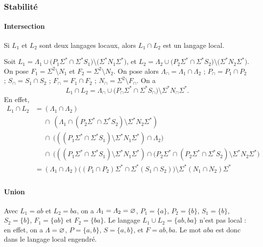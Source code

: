 \subsubsection{Stabilité}
\paragraph{Intersection}

\begin{prop}
	Si $L_1$\/ et $L_2$\/ sont deux langages locaux, alors $L_1 \cap L_2$\/ est un langage local.
\end{prop}

\begin{prv}
	Soit $L_1 = \Lambda_1 \cup \big(P_1 \Sigma^* \cap \Sigma^* S_1\big)\setminus\big(\Sigma^* N_1 \Sigma^*\big)$, et $L_2 = \Lambda_2 \cup \big(P_2 \Sigma^* \cap \Sigma^* S_2\big)\setminus\big(\Sigma^* N_2 \Sigma^*\big)$. On pose $F_1 = \Sigma^2 \setminus N_1$\/ et $F_2 = \Sigma^2 \setminus N_2$.
	On pose alors $\Lambda_\cap = \Lambda_1 \cap \Lambda_2$\/ ; $P_\cap = P_1 \cap P_2$\/ ; $S_\cap = S_1 \cap S_2$\/ ; $F_\cap = F_1 \cap F_2$\/ ; $N_\cap = \Sigma^2 \setminus F_\cap$. On a \[
		L_1 \cap L_2 = \Lambda_\cap \cup \big(P_\cap \Sigma^* \cap \Sigma^* S_\cap \big) \setminus \Sigma^* N_\cap \Sigma^*
	.\]
	En effet,
	\begin{align*}
		L_1 \cap L_2 &= (\Lambda_1 \cap \Lambda_2) \\
		&\mathrel{\phantom=}\cap\: (\Lambda_1 \cap (P_2\Sigma^* \cap \Sigma^*S_2) \setminus \Sigma^* N_2 \Sigma^*)\\
		&\mathrel{\phantom=}\cap\: \big(((P_1\Sigma^* \cap \Sigma^*S_1)\setminus \Sigma^* N_1 \Sigma^*) \cap \Lambda_2\big) \\
		&\mathrel{\phantom=}\cap\:\big(((P_1 \Sigma^* \cap \Sigma^* S_1)\setminus \Sigma^* N_1 \Sigma^*) \cap (P_2 \Sigma^* \cap (P_2 \Sigma^* \cap \Sigma^* S_2)\setminus \Sigma^* N_2 \Sigma^*\big)\\
		&= (\Lambda_1 \cap \Lambda_2) \big((P_1 \cap P_2) \Sigma^* \cap \Sigma^* (S_1 \cap S_2) \big) \setminus \Sigma^* (N_1 \cap N_2) \Sigma^* \\
	\end{align*}
\end{prv}

\paragraph{Union}

\begin{cexm}
	Avec $L_1 = ab$\/ et $L_2 = ba$, on a $\varLambda_1 = \varLambda_2 = \varnothing$, $P_1 = \{a\}$, $P_2 = \{b\}$, $S_1 = \{b\}$, $S_2 = \{b\}$, $F_1 = \{ab\}$\/ et $F_2 = \{ba\}$.
	Le langage $L_1 \cup L_2 = \{ab,ba\} $\/ n'est pas local : en effet, on a $\varLambda = \varnothing$, $P = \{a,b\}$, $S= \{a,b\}$, et $F = ab,ba$. Le mot $aba$\/ est donc dans le langage local engendré.
\end{cexm}


